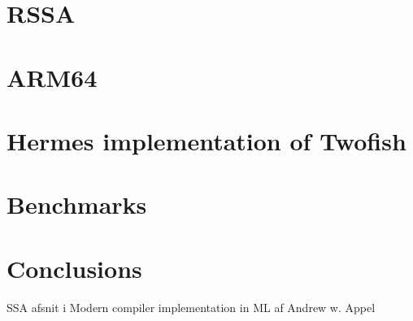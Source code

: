 \documentclass[a4paper,10pt,openright]{memoir}
\begin{document}
\chapter{RSSA}




\chapter{ARM64}





\chapter{Hermes implementation of Twofish}
\label{chapt - Hermes implementation}


\chapter{Benchmarks}
\label{chapt - Benchmarks}


\chapter{Conclusions}
\label{chapt - Conclusion}







\newpage
\renewcommand\bibname{References}


SSA afsnit i Modern compiler implementation in ML af Andrew w. Appel
\end{document}
